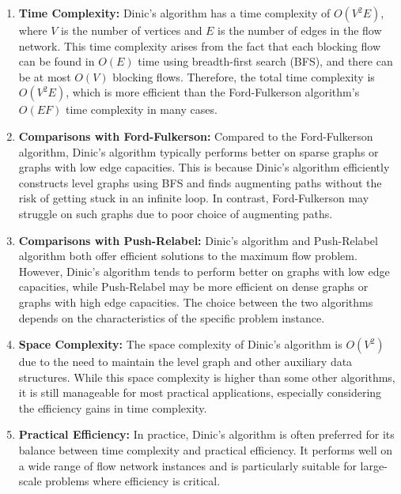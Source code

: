 \documentclass[12pt]{book} %
\begin{document}
\begin{enumerate}
    \item \textbf{Time Complexity:} Dinic's algorithm has a time complexity of \(O(V^2E)\), where \(V\) is the number of vertices and \(E\) is the number of edges in the flow network. This time complexity arises from the fact that each blocking flow can be found in \(O(E)\) time using breadth-first search (BFS), and there can be at most \(O(V)\) blocking flows. Therefore, the total time complexity is \(O(V^2E)\), which is more efficient than the Ford-Fulkerson algorithm's \(O(EF)\) time complexity in many cases.
    
    \item \textbf{Comparisons with Ford-Fulkerson:} Compared to the Ford-Fulkerson algorithm, Dinic's algorithm typically performs better on sparse graphs or graphs with low edge capacities. This is because Dinic's algorithm efficiently constructs level graphs using BFS and finds augmenting paths without the risk of getting stuck in an infinite loop. In contrast, Ford-Fulkerson may struggle on such graphs due to poor choice of augmenting paths.
    
    \item \textbf{Comparisons with Push-Relabel:} Dinic's algorithm and Push-Relabel algorithm both offer efficient solutions to the maximum flow problem. However, Dinic's algorithm tends to perform better on graphs with low edge capacities, while Push-Relabel may be more efficient on dense graphs or graphs with high edge capacities. The choice between the two algorithms depends on the characteristics of the specific problem instance.
    
    \item \textbf{Space Complexity:} The space complexity of Dinic's algorithm is \(O(V^2)\) due to the need to maintain the level graph and other auxiliary data structures. While this space complexity is higher than some other algorithms, it is still manageable for most practical applications, especially considering the efficiency gains in time complexity.
    
    \item \textbf{Practical Efficiency:} In practice, Dinic's algorithm is often preferred for its balance between time complexity and practical efficiency. It performs well on a wide range of flow network instances and is particularly suitable for large-scale problems where efficiency is critical.
\end{enumerate}
\end{document}

